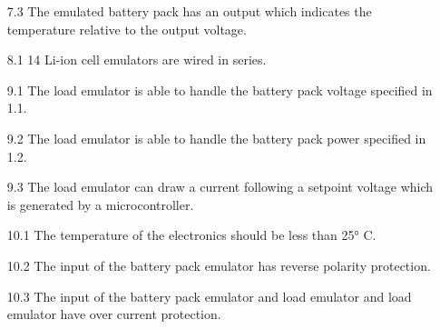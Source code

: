 \begin{enumerate}
    \item[7.3] The emulated battery pack has an output which indicates the
    temperature relative to the output voltage.
    \item[8.1] 14 Li-ion cell emulators are wired in series. 
    \item[9.1] The load emulator is able to handle the battery pack voltage
    specified in 1.1.
    \item[9.2] The load emulator is able to handle the battery pack power
    specified in 1.2.
    \item[9.3] The load emulator can draw a current following a setpoint 
    voltage which is generated by a microcontroller.
    \item[10.1] The temperature of the electronics should be less than 25° C.
    \item[10.2] The input of the battery pack emulator has reverse polarity
    protection.
    \item[10.3] The input of the battery pack emulator and load emulator and
    load emulator have over current protection.  
\end{enumerate}